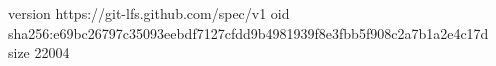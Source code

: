 version https://git-lfs.github.com/spec/v1
oid sha256:e69bc26797c35093eebdf7127cfdd9b4981939f8e3fbb5f908c2a7b1a2e4c17d
size 22004
